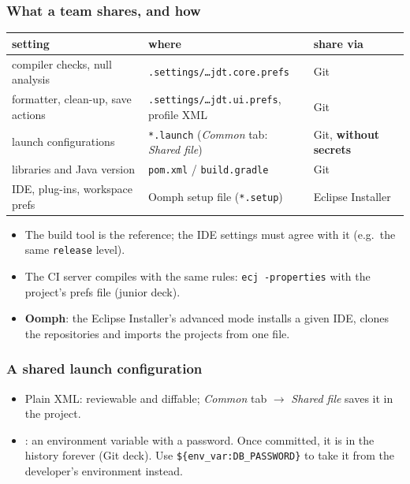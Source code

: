 \documentclass[aspectratio=169,10pt,compress]{beamer}
\begin{document}




\begin{frame}[t,fragile] \frametitle{What a team shares, and how}
  \begin{center}\footnotesize
  \begin{tabular}{@{}L{0.28\textwidth}L{0.42\textwidth}L{0.24\textwidth}@{}}
    \toprule
    \textbf{setting}                    & \textbf{where}                                       & \textbf{share via} \\
    \midrule
    compiler checks, null analysis      & \texttt{.settings/\dots jdt.core.prefs}              & Git \\
    formatter, clean-up, save actions   & \texttt{.settings/\dots jdt.ui.prefs}, profile XML   & Git \\
    launch configurations               & \texttt{*.launch} (\emph{Common} tab: \emph{Shared file}) & Git, \textbf{without secrets} \\
    libraries and Java version          & \texttt{pom.xml} / \texttt{build.gradle}             & Git \\
    IDE, plug-ins, workspace prefs      & Oomph setup file (\texttt{*.setup})                  & Eclipse Installer \\
    \bottomrule
  \end{tabular}
  \end{center}
  \begin{itemize}\small
    \item The build tool is the reference; the IDE settings must agree with it (e.g.\ the same \texttt{release} level).
    \item The CI server compiles with the same rules: \texttt{ecj -properties} with the project's prefs file (junior deck).
    \item \textbf{Oomph}: the Eclipse Installer's advanced mode installs a given IDE, clones the repositories and imports the projects from one file.
  \end{itemize}
\end{frame}




\begin{frame}[t,fragile] \frametitle{A shared launch configuration}
  \begin{itemize}\small
    \item Plain XML: reviewable and diffable; \emph{Common} tab $\to$ \emph{Shared file} saves it in the project.
    \item {}: an environment variable with a password. Once committed, it is in the history forever (Git deck).
          Use \texttt{\$\{env\_var:DB\_PASSWORD\}} to take it from the developer's environment instead.
  \end{itemize}
\end{frame}
\end{document}
